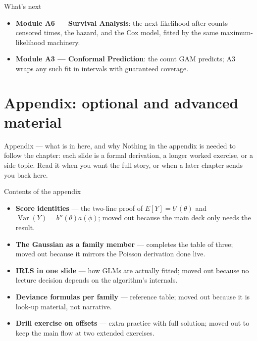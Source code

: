 \documentclass[aspectratio=169,11pt]{beamer}
\begin{document}
\begin{frame}{What's next}
  \begin{itemize}
    \item \textbf{Module A6 --- Survival Analysis}: the next likelihood after
          counts --- censored times, the hazard, and the Cox model, fitted by the
          same maximum-likelihood machinery.
    \item \textbf{Module A3 --- Conformal Prediction}: the count GAM predicts;
          A3 wraps any such fit in intervals with guaranteed coverage.
  \end{itemize}
\end{frame}


\appendix
\AtBeginSection[]{}
\section{Appendix: optional and advanced material}

\begin{frame}{Appendix --- what is in here, and why}
  Nothing in the appendix is needed to follow the chapter: each slide is a formal
  derivation, a longer worked exercise, or a side topic. Read it when you want the
  full story, or when a later chapter sends you back here.
  \begin{block}{Contents of the appendix}
    \begin{itemize}
      \item \textbf{Score identities} --- the two-line proof of $E[Y]=b'(\theta)$ and
            $\operatorname{Var}(Y)=b''(\theta)a(\phi)$; moved out because the main deck
            only needs the result.
      \item \textbf{The Gaussian as a family member} --- completes the table of three;
            moved out because it mirrors the Poisson derivation done live.
      \item \textbf{IRLS in one slide} --- how GLMs are actually fitted; moved out
            because no lecture decision depends on the algorithm's internals.
      \item \textbf{Deviance formulas per family} --- reference table; moved out
            because it is look-up material, not narrative.
      \item \textbf{Drill exercise on offsets} --- extra practice with full solution;
            moved out to keep the main flow at two extended exercises.
    \end{itemize}
  \end{block}
\end{frame}
\end{document}
